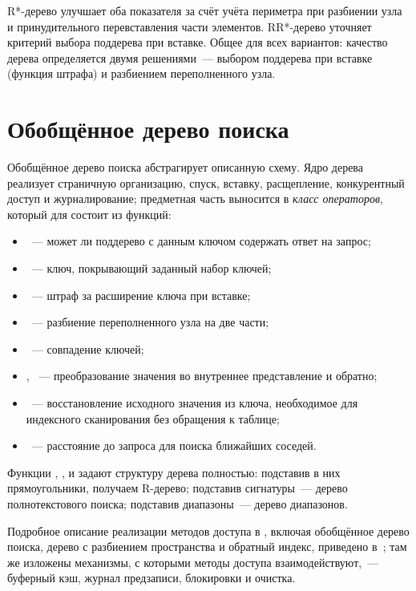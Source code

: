 R*-дерево \cite{beckmann1990rstar} улучшает оба показателя за счёт учёта
периметра при разбиении узла и принудительного перевставления части элементов.
RR*-дерево \cite{beckmann2009rrstar} уточняет критерий выбора поддерева при
вставке. Общее для всех вариантов: качество дерева определяется двумя решениями~---
выбором поддерева при вставке (функция штрафа) и разбиением переполненного узла.

\section{Обобщённое дерево поиска}

Обобщённое дерево поиска \cite{hellerstein1995generalized} абстрагирует
описанную схему. Ядро дерева реализует страничную организацию, спуск, вставку,
расщепление, конкурентный доступ и журналирование; предметная часть выносится в
\emph{класс операторов}, который для \pg{} состоит из функций:

\begin{itemize}
\item {}~--- может ли поддерево с данным ключом содержать ответ
      на запрос;
\item {}~--- ключ, покрывающий заданный набор ключей;
\item {}~--- штраф за расширение ключа при вставке;
\item {}~--- разбиение переполненного узла на две части;
\item {}~--- совпадение ключей;
\item {}, ~--- преобразование значения во
      внутреннее представление и обратно;
\item {}~--- восстановление исходного значения из ключа, необходимое
      для индексного сканирования без обращения к таблице;
\item {}~--- расстояние до запроса для поиска ближайших соседей.
\end{itemize}

Функции , ,  и 
задают структуру дерева полностью: подставив в них прямоугольники, получаем
R-дерево; подставив сигнатуры~--- дерево полнотекстового поиска; подставив
диапазоны~--- дерево диапазонов.

Подробное описание реализации методов доступа в \pg{}, включая обобщённое
дерево поиска, дерево с разбиением пространства и обратный индекс, приведено
в~\cite{rogov2026}; там же изложены механизмы, с которыми методы доступа
взаимодействуют,~--- буферный кэш, журнал предзаписи, блокировки и очистка.

